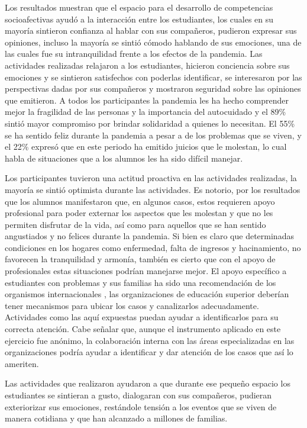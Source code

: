 \documentclass{textolivre}
\begin{document}
Los resultados muestran que el espacio para el desarrollo de competencias socioafectivas ayudó a la interacción entre los estudiantes, los cuales en su mayoría sintieron confianza al hablar con sus compañeros, pudieron expresar sus opiniones, incluso la mayoría se sintió cómodo hablando de sus emociones, una de las cuales fue su intranquilidad frente a los efectos de la pandemia. Las actividades realizadas relajaron a los estudiantes, hicieron conciencia sobre sus emociones y se sintieron satisfechos con poderlas identificar, se interesaron por las perspectivas dadas por sus compañeros y mostraron seguridad sobre las opiniones que emitieron. A todos los participantes la pandemia les ha hecho comprender mejor la fragilidad de las personas y la importancia del autocuidado y el 89\% sintió mayor compromiso por brindar solidaridad a quienes lo necesitan. El 55\% se ha sentido feliz durante la pandemia a pesar a de los problemas que se viven, y el 22\% expresó que en este periodo ha emitido juicios que le molestan, lo cual habla de situaciones que a los alumnos les ha sido difícil manejar. 

Los participantes tuvieron una actitud proactiva en las actividades realizadas, la mayoría se sintió optimista durante las actividades. Es notorio, por los resultados que los alumnos manifestaron que, en algunos casos, estos requieren apoyo profesional para poder externar los aspectos que les molestan y que no les permiten disfrutar de la vida, así como para aquellos que se han sentido angustiados y no felices durante la pandemia. Si bien es claro que determinadas condiciones en los hogares como enfermedad, falta de ingresos y hacinamiento, no favorecen la tranquilidad y armonía, también es cierto que con el apoyo de profesionales estas situaciones podrían manejarse mejor. El apoyo específico a estudiantes con problemas y sus familias ha sido una recomendación de los organismos internacionales \cite{lopez2021}, las organizaciones de educación superior deberían tener mecanismos para ubicar los casos y canalizarlos adecuadamente. Actividades como las aquí expuestas puedan ayudar a identificarlos para su correcta atención. Cabe señalar que, aunque el instrumento aplicado en este ejercicio fue anónimo, la colaboración interna con las áreas especializadas en las organizaciones podría ayudar a identificar y dar atención de los casos que así lo ameriten.

Las actividades que realizaron ayudaron a que durante ese pequeño espacio los estudiantes se sintieran a gusto, dialogaran con sus compañeros, pudieran exteriorizar sus emociones, restándole tensión a los eventos que se viven de manera cotidiana y que han alcanzado a millones de familias.
\end{document}
